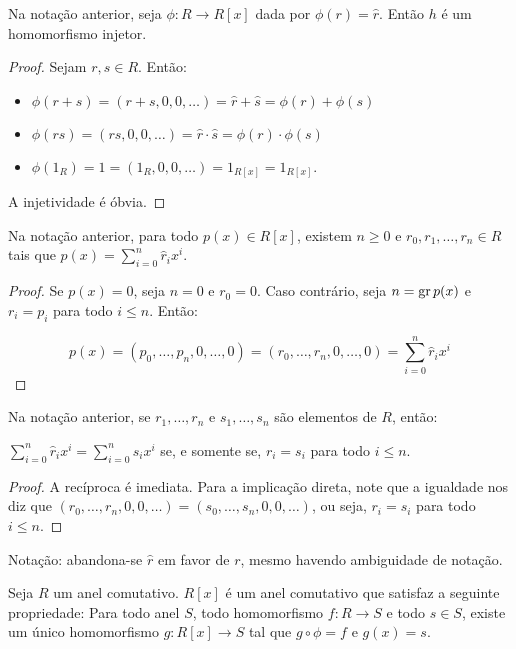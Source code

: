 \begin{lemma}
    Na notação anterior, seja $\phi:R\rightarrow R[x]$ dada por $\phi(r)=\hat r$. Então $h$ é um homomorfismo injetor.
\end{lemma}
    
\begin{proof}
    Sejam $r, s \in R$. Então:
    \begin{itemize}
        \item $\phi(r+s)=(r+s, 0, 0, \dots)=\hat r+\hat s=\phi(r)+\phi(s)$
        \item $\phi(rs)=(rs, 0, 0, \dots)=\hat r\cdot \hat s=\phi(r)\cdot \phi(s)$
        \item $\phi(1_R)=\hat 1=(1_R, 0, 0, \dots)=1_{R[x]}=1_{R[x]}$.
    \end{itemize}

    A injetividade é óbvia.
\end{proof}

\begin{prop}
    Na notação anterior, para todo $p(x)\in R[x]$, existem $n\geq 0$ e $r_0, r_1, \dots, r_n\in R$ tais que $p(x)=\sum_{i=0}^n \hat r_ix^i$.
\end{prop}
    
\begin{proof}
    Se $p(x)=0$, seja $n=0$ e $r_0=0$. Caso contrário, seja $n=\operatorname{gr} p(x)$ e $r_i=p_i$ para todo $i\leq n$. Então:

    $$p(x)=(p_0, \dots, p_n, 0, \dots, 0)=(r_0, \dots, r_n, 0, \dots, 0)=\sum_{i=0}^n\hat r_ix^i$$
\end{proof}

\begin{prop}
    Na notação anterior, se $r_1, \dots, r_n$ e $s_1, \dots, s_n$ são elementos de $R$, então:

    $\sum_{i=0}^n \hat r_i x^i=\sum_{i=0}^n \hat s_i x^i$ se, e somente se, $r_i=s_i$ para todo $i\leq n$.
\end{prop}
    
\begin{proof}
A recíproca é imediata. Para a implicação direta, note que a igualdade nos diz que $(r_0, \dots, r_n, 0, 0, \dots)=(s_0, \dots, s_n, 0, 0, \dots)$, ou seja, $r_i=s_i$ para todo $i\leq n$.
\end{proof}

Notação: abandona-se $\hat r$ em favor de $r$, mesmo havendo ambiguidade de notação.

\begin{prop}
    Seja $R$ um anel comutativo.
    $R[x]$ é um anel comutativo que satisfaz a seguinte propriedade:
    Para todo anel $S$, todo homomorfismo $f:R\rightarrow S$ e todo $s \in S$, existe um único homomorfismo $g:R[x]\rightarrow S$ tal que $g\circ \phi=f$ e $g(x)=s$.
\end{prop}

